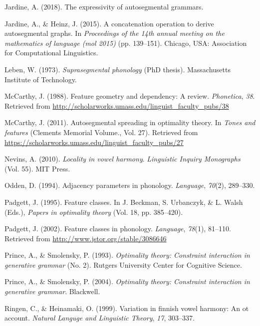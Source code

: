 \documentclass[floatsintext,man]{apa6}
\theoremstyle{definition}
\theoremstyle{definition}
\theoremstyle{definition}
\theoremstyle{remark}
\begin{document}
\hypertarget{ref-jardineexpressag}{}
Jardine, A. (2018). The expressivity of autosegmental grammars.

\hypertarget{ref-jardineheinz2015}{}
Jardine, A., \& Heinz, J. (2015). A concatenation operation to derive
autosegmental graphs. In \emph{Proceedings of the 14th annual meeting on
the mathematics of language (mol 2015)} (pp. 139--151). Chicago, USA:
Association for Computational Linguistics.

\hypertarget{ref-leben1973}{}
Leben, W. (1973). \emph{Suprasegmental phonology} (PhD thesis).
Massachusetts Institute of Technology.

\hypertarget{ref-mccarthyfg1988}{}
McCarthy, J. (1988). Feature geometry and dependency: A review.
\emph{Phonetica}, \emph{38}. Retrieved from
\url{http://scholarworks.umass.edu/linguist_faculty_pubs/38}

\hypertarget{ref-mccarthy2011}{}
McCarthy, J. (2011). Autosegmental spreading in optimality theory. In
\emph{Tones and features} (Clements Memorial Volume., Vol. 27).
Retrieved from
\url{https://scholarworks.umass.edu/linguist_faculty_pubs/27}

\hypertarget{ref-Nevins2010}{}
Nevins, A. (2010). \emph{Locality in vowel harmony}. \emph{Linguistic
Inquiry Monographs} (Vol. 55). MIT Press.

\hypertarget{ref-odden1994}{}
Odden, D. (1994). Adjacency parameters in phonology. \emph{Language},
\emph{70}(2), 289--330.

\hypertarget{ref-padgett1995}{}
Padgett, J. (1995). Feature classes. In J. Beckman, S. Urbanczyk, \& L.
Walsh (Eds.), \emph{Papers in optimality theory} (Vol. 18, pp.
385--420).

\hypertarget{ref-padgett2002}{}
Padgett, J. (2002). Feature classes in phonology. \emph{Language},
\emph{78}(1), 81--110. Retrieved from
\url{http://www.jstor.org/stable/3086646}

\hypertarget{ref-princesmolensky1993}{}
Prince, A., \& Smolensky, P. (1993). \emph{Optimality theory: Constraint
interaction in generative grammar} (No. 2). Rutgers University Center
for Cognitive Science.

\hypertarget{ref-princesmolensky2004}{}
Prince, A., \& Smolensky, P. (2004). \emph{Optimality theory: Constraint
interaction in generative grammar}. Blackwell.

\hypertarget{ref-ringenheinamaki1999}{}
Ringen, C., \& Heinamaki, O. (1999). Variation in finnish vowel harmony:
An ot account. \emph{Natural Languge and Linguistic Theory}, \emph{17},
303--337.
\end{document}
